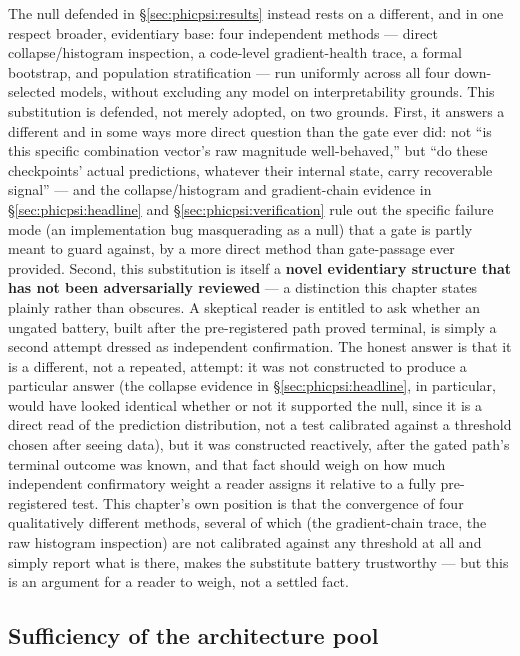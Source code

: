 The null defended in \S\ref{sec:phicpsi:results} instead rests on a different, and in one respect broader, evidentiary base: four independent methods --- direct collapse/histogram inspection, a code-level gradient-health trace, a formal bootstrap, and population stratification --- run uniformly across all four down-selected models, without excluding any model on interpretability grounds.
This substitution is defended, not merely adopted, on two grounds.
First, it answers a different and in some ways more direct question than the gate ever did: not ``is this specific combination vector's raw magnitude well-behaved,'' but ``do these checkpoints' actual predictions, whatever their internal state, carry recoverable signal'' --- and the collapse/histogram and gradient-chain evidence in \S\ref{sec:phicpsi:headline} and \S\ref{sec:phicpsi:verification} rule out the specific failure mode (an implementation bug masquerading as a null) that a gate is partly meant to guard against, by a more direct method than gate-passage ever provided.
Second, this substitution is itself a \textbf{novel evidentiary structure that has not been adversarially reviewed} --- a distinction this chapter states plainly rather than obscures.
A skeptical reader is entitled to ask whether an ungated battery, built after the pre-registered path proved terminal, is simply a second attempt dressed as independent confirmation.
The honest answer is that it is a different, not a repeated, attempt: it was not constructed to produce a particular answer (the collapse evidence in \S\ref{sec:phicpsi:headline}, in particular, would have looked identical whether or not it supported the null, since it is a direct read of the prediction distribution, not a test calibrated against a threshold chosen after seeing data), but it was constructed reactively, after the gated path's terminal outcome was known, and that fact should weigh on how much independent confirmatory weight a reader assigns it relative to a fully pre-registered test.
This chapter's own position is that the convergence of four qualitatively different methods, several of which (the gradient-chain trace, the raw histogram inspection) are not calibrated against any threshold at all and simply report what is there, makes the substitute battery trustworthy --- but this is an argument for a reader to weigh, not a settled fact.

\subsection{Sufficiency of the architecture pool}
\label{sec:phicpsi:pool}

